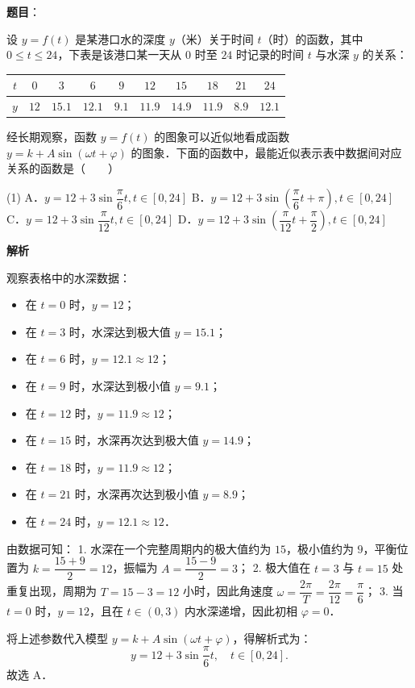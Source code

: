 \begin{answer}

\textbf{题目}：

设 $y = f(t)$ 是某港口水的深度 $y$（米）关于时间 $t$（时）的函数，其中 $0 \leqslant t \leqslant 24$，下表是该港口某一天从 $0$ 时至 $24$ 时记录的时间 $t$ 与水深 $y$ 的关系：

\begin{center}
\begingroup\setlength{\tabcolsep}{4pt}
\begin{tabular}{cccccccccc}
\toprule
$t$ & $0$ & $3$ & $6$ & $9$ & $12$ & $15$ & $18$ & $21$ & $24$ \\
\midrule
$y$ & $12$ & $15.1$ & $12.1$ & $9.1$ & $11.9$ & $14.9$ & $11.9$ & $8.9$ & $12.1$ \\
\bottomrule
\end{tabular}
\endgroup
\end{center}

经长期观察，函数 $y = f(t)$ 的图象可以近似地看成函数 $y = k + A\sin(\omega t + \varphi)$ 的图象．下面的函数中，最能近似表示表中数据间对应关系的函数是\mbox{（　　）}

\begin{gkopts}(1)
\task A．$y = 12 + 3\sin\dfrac{\pi}{6}t, t \in [0, 24]$
\task B．$y = 12 + 3\sin\left(\dfrac{\pi}{6}t + \pi\right), t \in [0, 24]$
\task C．$y = 12 + 3\sin\dfrac{\pi}{12}t, t \in [0, 24]$
\task D．$y = 12 + 3\sin\left(\dfrac{\pi}{12}t + \dfrac{\pi}{2}\right), t \in [0, 24]$
\end{gkopts}

\textbf{解析}

观察表格中的水深数据：
\begin{itemize}
\item 在 $t = 0$ 时，$y = 12$；
\item 在 $t = 3$ 时，水深达到极大值 $y = 15.1$；
\item 在 $t = 6$ 时，$y = 12.1 \approx 12$；
\item 在 $t = 9$ 时，水深达到极小值 $y = 9.1$；
\item 在 $t = 12$ 时，$y = 11.9 \approx 12$；
\item 在 $t = 15$ 时，水深再次达到极大值 $y = 14.9$；
\item 在 $t = 18$ 时，$y = 11.9 \approx 12$；
\item 在 $t = 21$ 时，水深再次达到极小值 $y = 8.9$；
\item 在 $t = 24$ 时，$y = 12.1 \approx 12$．
\end{itemize}

由数据可知：
1. 水深在一个完整周期内的极大值约为 $15$，极小值约为 $9$，平衡位置为 $k = \dfrac{15 + 9}{2} = 12$，振幅为 $A = \dfrac{15 - 9}{2} = 3$；
2. 极大值在 $t = 3$ 与 $t = 15$ 处重复出现，周期为 $T = 15 - 3 = 12$ 小时，因此角速度 $\omega = \dfrac{2\pi}{T} = \dfrac{2\pi}{12} = \dfrac{\pi}{6}$；
3. 当 $t = 0$ 时，$y = 12$，且在 $t \in (0, 3)$ 内水深递增，因此初相 $\varphi = 0$．

将上述参数代入模型 $y = k + A\sin(\omega t + \varphi)$，得解析式为：
\nopagebreak[4]
\[
y = 12 + 3\sin\frac{\pi}{6}t, \quad t \in [0, 24].
\]
故选 A．


\end{answer}
